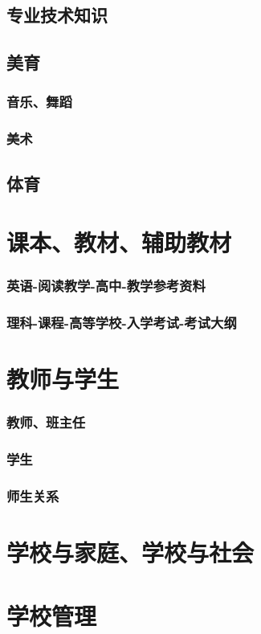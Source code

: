 \documentclass[UTF8]{../../ApplicationUniverse}
\begin{document}
    \subsection{专业技术知识}
    \subsection{美育}
        \subsubsection{音乐、舞蹈}
        \subsubsection{美术}
    \subsection{体育}
\section{课本、教材、辅助教材}
    \subsubsection{英语-阅读教学-高中-教学参考资料}
    \subsubsection{理科-课程-高等学校-入学考试-考试大纲}
\section{教师与学生}
    \subsubsection{教师、班主任}
    \subsubsection{学生}
    \subsubsection{师生关系}
\section{学校与家庭、学校与社会}
\section{学校管理}
\end{document}
